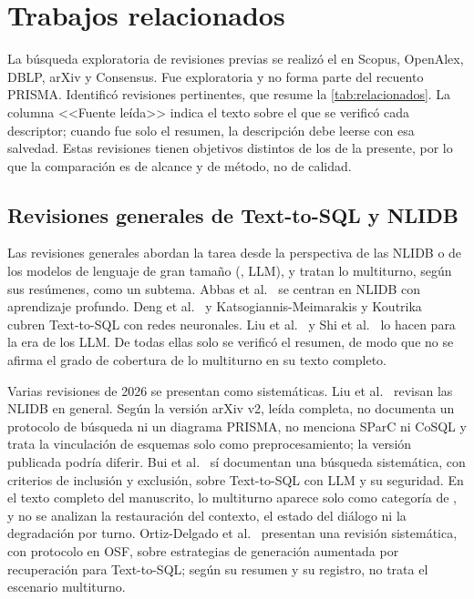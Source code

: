 \section{Trabajos relacionados}
\label{sec:relacionados}



La búsqueda exploratoria de revisiones previas se realizó el \fechaBusquedaExploratoria{} en Scopus, OpenAlex, DBLP, arXiv y Consensus. Fue exploratoria y no forma parte del recuento PRISMA. Identificó \nRevisionesPrevias{} revisiones pertinentes, que resume la \cref{tab:relacionados}. La columna <<Fuente leída>> indica el texto sobre el que se verificó cada descriptor; cuando fue solo el resumen, la descripción debe leerse con esa salvedad. Estas revisiones tienen objetivos distintos de los de la presente, por lo que la comparación es de alcance y de método, no de calidad.

\subsection{Revisiones generales de Text-to-SQL y NLIDB}
\label{sec:rel-generales}

Las revisiones generales abordan la tarea desde la perspectiva de las NLIDB o de los modelos de lenguaje de gran tamaño (, LLM), y tratan lo multiturno, según sus resúmenes, como un subtema. Abbas et al.~\cite{Abbas2022NLIDB} se centran en NLIDB con aprendizaje profundo. Deng et al.~\cite{Deng2022Recent} y Katsogiannis-Meimarakis y Koutrika~\cite{Katsogiannis2023Survey} cubren Text-to-SQL con redes neuronales. Liu et al.~\cite{Liu2025SurveyLLMs} y Shi et al.~\cite{Shi2026SurveyLLM} lo hacen para la era de los LLM. De todas ellas solo se verificó el resumen, de modo que no se afirma el grado de cobertura de lo multiturno en su texto completo.

Varias revisiones de 2026 se presentan como sistemáticas. Liu et al.~\cite{Liu2026NLIDBReview} revisan las NLIDB en general. Según la versión arXiv v2, leída completa, no documenta un protocolo de búsqueda ni un diagrama PRISMA, no menciona SParC ni CoSQL y trata la vinculación de esquemas solo como preprocesamiento; la versión publicada podría diferir. Bui et al.~\cite{Bui2026Survey} sí documentan una búsqueda sistemática, con criterios de inclusión y exclusión, sobre Text-to-SQL con LLM y su seguridad. En el texto completo del manuscrito, lo multiturno aparece solo como categoría de , y no se analizan la restauración del contexto, el estado del diálogo ni la degradación por turno. Ortiz-Delgado et al.~\cite{OrtizDelgado2026RAG} presentan una revisión sistemática, con protocolo en OSF, sobre estrategias de generación aumentada por recuperación para Text-to-SQL; según su resumen y su registro, no trata el escenario multiturno.

